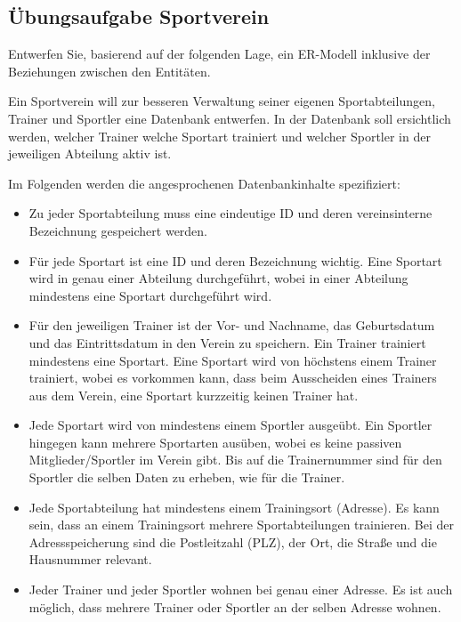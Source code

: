       \subsection{\"Ubungsaufgabe Sportverein}
        Entwerfen Sie, basierend auf der folgenden Lage, ein ER-Modell inklusive der Beziehungen zwischen
        den Entit\"{a}ten.

        Ein Sportverein will zur besseren Verwaltung seiner eigenen Sportabteilungen, Trainer und
        Sportler eine Datenbank entwerfen. In der Datenbank soll ersichtlich werden, welcher Trainer
        welche Sportart trainiert und welcher Sportler in der jeweiligen Abteilung aktiv ist.

        Im Folgenden werden die angesprochenen Datenbankinhalte spezifiziert:
        \begin{itemize}
          \item Zu jeder Sportabteilung muss eine eindeutige ID und deren vereinsinterne
          Bezeichnung gespeichert werden.
          \item F\"ur jede Sportart ist eine ID und deren Bezeichnung wichtig. Eine Sportart wird in genau einer
          Abteilung durchgef\"uhrt, wobei in einer Abteilung mindestens eine Sportart durchgef\"uhrt wird.
          \item F\"ur den jeweiligen Trainer ist der Vor- und Nachname, das Geburtsdatum
          und das Eintrittsdatum in den Verein zu speichern. Ein Trainer trainiert mindestens eine Sportart.
          Eine Sportart wird von h\"ochstens einem Trainer trainiert, wobei es vorkommen kann, dass beim
          Ausscheiden eines Trainers aus dem Verein, eine Sportart kurzzeitig keinen Trainer hat.
          \item Jede Sportart wird von mindestens einem Sportler ausge\"ubt. Ein Sportler hingegen kann mehrere
          Sportarten aus\"uben, wobei es keine passiven Mitglieder/Sportler im Verein gibt. Bis auf die
          Trainernummer sind f\"ur den Sportler die selben Daten zu erheben, wie f\"ur die Trainer.
          \item Jede Sportabteilung hat mindestens einem Trainingsort (Adresse). Es kann sein, dass an
          einem Trainingsort mehrere Sportabteilungen trainieren. Bei der Adressspeicherung sind die
          Postleitzahl (PLZ), der Ort, die Stra\ss e und die Hausnummer relevant.
          \item Jeder Trainer und jeder Sportler wohnen bei genau einer Adresse. Es ist auch m\"oglich,
          dass mehrere Trainer oder Sportler an der selben Adresse wohnen.
        \end{itemize}
\clearpage
